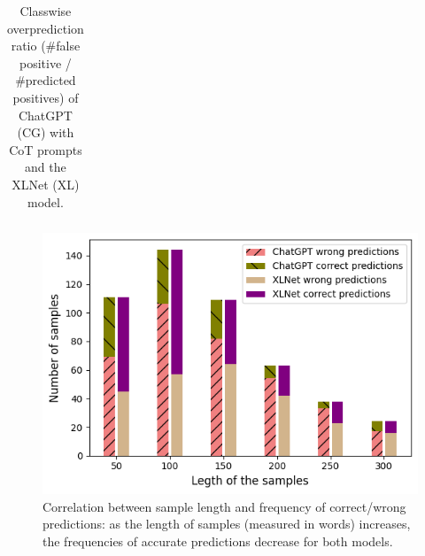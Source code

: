 \documentclass[letterpaper]{article} %
\begin{document}
\begin{itemize}
\begin{table}[h!]
\begin{tabular}{l|cccccc}
  
\end{tabular}
\caption{ Classwise overprediction ratio (\#false positive / \#predicted positives) of ChatGPT (CG) with CoT prompts and the XLNet (XL) model. %
}
\label{over-pred}
\end{table}





\begin{figure}[h!]
  \centering
  \includegraphics[width =0.85\linewidth]{Figures/Length.png}
 \caption{Correlation between sample length and frequency of correct/wrong predictions: as the length of samples (measured in words) increases, the frequencies of accurate predictions decrease for both models.} 
 \label{leng-dis}
\end{figure}



\end{itemize}
\end{document}
